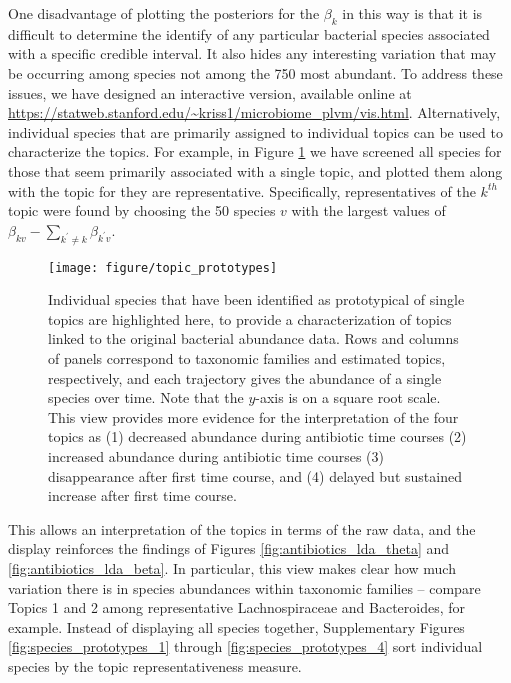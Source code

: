 \documentclass{article}
\begin{document}
One disadvantage of plotting the posteriors for the $\beta_{k}$ in this way is
that it is difficult to determine the identify of any particular bacterial
species associated with a specific credible interval. It also hides any
interesting variation that may be occurring among species not among the 750 most
abundant. To address these issues, we have designed an interactive version,
available online at
\url{https://statweb.stanford.edu/~kriss1/microbiome_plvm/vis.html}.
Alternatively,
individual species that are primarily assigned to individual topics can be used
to characterize the topics. For example, in Figure \ref{fig:topic_prototypes} we
have screened all species for those that seem primarily associated with a single
topic, and plotted them along with the topic for they are representative.
Specifically, representatives of the $k^{th}$ topic were found by choosing the
50 species $v$ with the largest values of $\beta_{kv} - \sum_{k^{\prime} \neq k}
\beta_{k^{\prime} v}$.

\begin{figure}[!p]
  \centering\texttt{[image: figure/topic\_prototypes]}
  \caption{Individual species that have been identified as prototypical of
    single topics are highlighted here, to provide a characterization of topics
    linked to the original bacterial abundance data. Rows and columns of panels
    correspond to taxonomic families and estimated topics,
    respectively, and each trajectory gives the abundance of a single species
    over time. Note that the $y$-axis is on a square root scale. This view
    provides more evidence for the interpretation of the four topics as (1)
    decreased abundance during antibiotic time courses (2) increased abundance during
    antibiotic time courses (3) disappearance after first time course, and (4)
    delayed but sustained increase after first time
    course. \label{fig:topic_prototypes}}
\end{figure}

This allows an interpretation of the topics in terms of the raw data, and the
display reinforces the findings of Figures \ref{fig:antibiotics_lda_theta} and
\ref{fig:antibiotics_lda_beta}. In particular, this view makes clear how much
variation there is in species abundances within taxonomic families -- compare
Topics 1 and 2 among representative Lachnospiraceae and Bacteroides, for
example. Instead of displaying all species together, Supplementary Figures
\ref{fig:species_prototypes_1} through \ref{fig:species_prototypes_4} sort
individual species by the topic representativeness measure.
\end{document}
